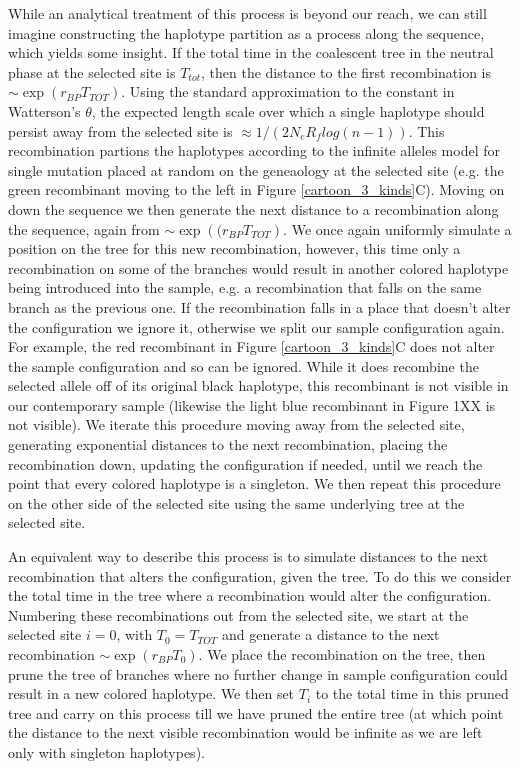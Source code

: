 \documentclass[a4paper,10pt]{article}
\begin{document}
While an analytical treatment of this process is beyond our reach, we can still imagine constructing the haplotype partition as a process along the sequence, which yields some insight. If the total time in the coalescent tree in the neutral phase at the selected site is $T_{tot}$, then the distance to the first recombination is $\sim \exp \left( r_{BP} T_{TOT} \right)$. Using the standard approximation to the constant in Watterson's $\theta$, the expected length scale over which a single haplotype should persist away from the selected site is $\approx 1/( 2 N_e R_f log(n-1))$. This recombination partions the haplotypes according to the infinite alleles model for single mutation placed at random on the geneaology at the selected site (e.g. the green recombinant moving to the left in Figure \ref{cartoon_3_kinds}C). Moving on down the sequence we then generate the next distance to a recombination along the sequence, again from $\sim \exp \left( (r_{BP} T_{TOT} \right)$. We once again uniformly simulate a position on the tree for this new recombination, however, this time only a recombination on some of the branches would result in another colored haplotype being introduced into the sample, e.g. a recombination that falls on the same branch as the previous one. If the recombination falls in a place that doesn't alter the configuration we ignore it, otherwise we split our sample configuration again. For example, the red recombinant in Figure \ref{cartoon_3_kinds}C does not alter the sample configuration and so can be ignored. While it does recombine the selected allele off of its original black haplotype, this recombinant is not visible in our contemporary sample (likewise the light blue recombinant in Figure 1XX is not visible). We iterate this procedure moving away from the selected site, generating exponential distances to the next recombination, placing the recombination down, updating the configuration if needed, until we reach the point that every colored haplotype is a singleton. We then repeat this procedure on the other side of the selected site using the same underlying tree at the selected site. 

An equivalent way to describe this process is to simulate distances to the next recombination that alters the configuration, given the tree. To do this we consider the total time in the tree where a recombination would alter the configuration. Numbering these recombinations out from the selected site,  we start at the selected site $i=0$, with $T_0 = T_{TOT}$ and generate a distance to the next recombination $\sim \exp(r_{BP} T_0)$. We place the recombination on the tree, then prune the tree of branches where no further change in sample configuration could result in a new colored haplotype. We then set $T_i$ to the total time in this pruned tree and carry on this process till we have pruned the entire tree (at which point the distance to the next visible recombination would be infinite as we are left only with singleton haplotypes). 
\end{document}
